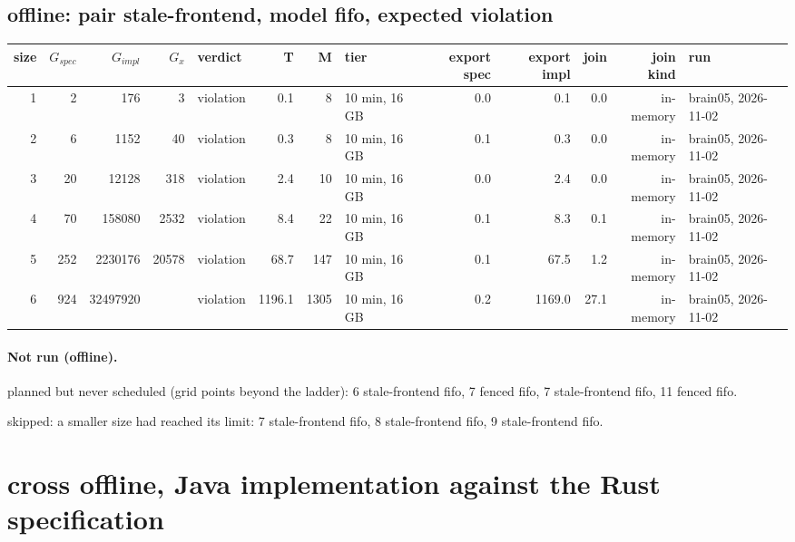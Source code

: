 \documentclass[10pt]{article}
\begin{document}
\subsection*{offline: pair \textsf{stale-frontend}, model fifo, expected violation}
\begin{longtable}{@{}rrrrlrrlrrrrl@{}}
\toprule
size & $G_{\mathit{spec}}$ & $G_{\mathit{impl}}$ & $G_x$ & verdict & T & M & tier & export spec & export impl & join & join kind & run \\
\midrule
\endhead
\color{red} 1 & 2 & 176 & 3 & violation & 0.1 & 8 & 10 min, 16 GB & 0.0 & 0.1 & 0.0 & in-memory & brain05, 2026-11-02 \\
\color{red} 2 & 6 & 1152 & 40 & violation & 0.3 & 8 & 10 min, 16 GB & 0.1 & 0.3 & 0.0 & in-memory & brain05, 2026-11-02 \\
\color{red} 3 & 20 & 12128 & 318 & violation & 2.4 & 10 & 10 min, 16 GB & 0.0 & 2.4 & 0.0 & in-memory & brain05, 2026-11-02 \\
\color{red} 4 & 70 & 158080 & 2532 & violation & 8.4 & 22 & 10 min, 16 GB & 0.1 & 8.3 & 0.1 & in-memory & brain05, 2026-11-02 \\
\color{red} 5 & 252 & 2230176 & 20578 & violation & 68.7 & 147 & 10 min, 16 GB & 0.1 & 67.5 & 1.2 & in-memory & brain05, 2026-11-02 \\
\color{red} 6 & 924 & 32497920 &  & violation & 1196.1 & 1305 & 10 min, 16 GB & 0.2 & 1169.0 & 27.1 & in-memory & brain05, 2026-11-02 \\
\bottomrule
\end{longtable}
\paragraph{Not run (offline).}
planned but never scheduled (grid points beyond the ladder): 6 stale-frontend fifo, 7 fenced fifo, 7 stale-frontend fifo, 11 fenced fifo.\par
skipped: a smaller size had reached its limit: 7 stale-frontend fifo, 8 stale-frontend fifo, 9 stale-frontend fifo.\par
\section*{cross offline, Java implementation against the Rust specification}
\end{document}
